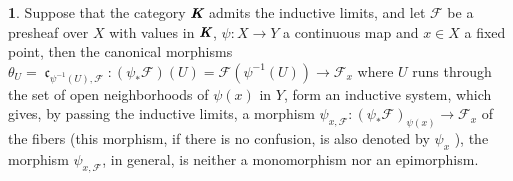 \documentclass[12pt]{amsart}
\newcommand{\can}{\operatorname{\mathfrak{c}}}
\theoremstyle{definition}
\newtheorem{bk}[proposition]{}
\begin{document}
\begin{bk}\label{I: 3.4.4} Suppose that the category $\emph{\textbf{K}}$ admits the inductive limits, and let $\mathscr{F}$ be a presheaf over $X$ with values in $\emph{\textbf{K}}$, $\psi:X\rightarrow Y$ a continuous map and $x\in X$ a fixed point, then the canonical morphisms $\theta_{U}=\can_{\psi^{-1}(U),\mathscr{F}}:(\psi_{\ast}\mathscr{F})(U)=
\mathscr{F}(\psi^{-1}(U))\rightarrow\mathscr{F}_{x}$ where $U$ runs through the set of open neighborhoods of $\psi(x)$ in $Y$, form an inductive system, which gives, by passing the inductive limits, a morphism $\psi_{x,\mathscr{F}} :(\psi_{\ast}\mathscr{F})_{\psi(x)}\rightarrow\mathscr{F}_{x}$ of the fibers (this morphism, if there is no confusion, is also denoted by $\psi_{x}$ ), the morphism $\psi_{x,\mathscr{F}}$, in general, is neither a monomorphism nor an epimorphism.


\end{bk}
\end{document}
